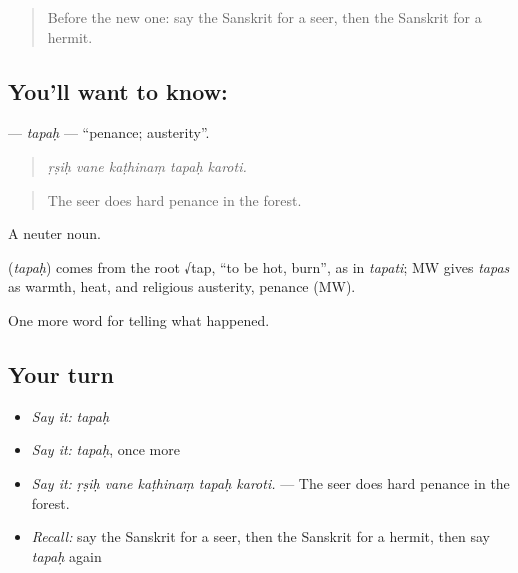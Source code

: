 \label{lesson:SA-C332-tapah}



\begin{quote}
Before the new one: say the Sanskrit for a seer, then the Sanskrit for a hermit.
\end{quote}

\subsection*{You'll want to know: }
\textbf{} — \emph{tapaḥ} — \textquotedblleft{}penance; austerity\textquotedblright{}.

\begin{quote}
    
\end{quote}

\begin{quote}
\emph{ṛṣiḥ vane kaṭhinaṃ tapaḥ karoti.}
\end{quote}

\begin{quote}
The seer does hard penance in the forest.
\end{quote}

A neuter noun.

\begin{cousinweb}
\textbf{} (\emph{tapaḥ}) comes from the root √tap, \textquotedblleft{}to be hot, burn\textquotedblright{}, as in \emph{tapati}; MW gives \emph{tapas} as warmth, heat, and religious austerity, penance (MW).
\end{cousinweb}

\begin{grammarlens}[title={What you've built}]
One more word for telling what happened.
\end{grammarlens}

\subsection*{Your turn}
\begin{itemize}
\raggedright
  \item \emph{Say it:} \emph{tapaḥ}
  \item \emph{Say it:} \emph{tapaḥ}, once more
  \item \emph{Say it:} \emph{ṛṣiḥ vane kaṭhinaṃ tapaḥ karoti.} — The seer does hard penance in the forest.
  \item \emph{Recall:} say the Sanskrit for a seer, then the Sanskrit for a hermit, then say \emph{tapaḥ} again
\end{itemize}


